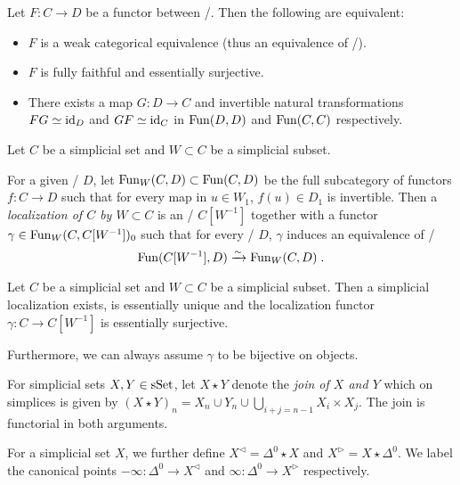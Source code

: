 \begin{thm}\label{thm:eqCharEqOfInftycats}
    Let $F\colon C\to D$ be a functor between \inftycats/.
    Then the following are equivalent:
    \begin{itemize}
        \item $F$ is a weak categorical equivalence (thus an equivalence of \inftycats/).
        \item $F$ is fully faithful and essentially surjective.
        \item There exists a map $G\colon D\to C$ and invertible natural transformations $FG\simeq \text{id}_D$ and $GF\simeq \text{id}_C$ in $\operatorname{Fun}(D,D)$ and $\operatorname{Fun}(C,C)$ respectively.
    \end{itemize}
    \begin{reference}
        \cite[Corollary 3.6.6 and Theorem 3.9.7]{cisinski_2019}
    \end{reference}
\end{thm}
\begin{definition}
    Let $C$ be a simplicial set and $W\subset C$ be a simplicial subset.

    For a given \inftycat/ $D$, let $\operatorname{Fun}_W(C,D)\subset\operatorname{Fun}(C,D)$ be the full subcategory of functors $f\colon C\to D$ such that for every map in $u\in W_1$, $f(u)\in D_1$ is invertible.
    Then a \emph{localization of $C$ by $W\subset C$} is an \inftycat/ $C[W^{-1}]$ together with a functor $\gamma\in\operatorname{Fun}_W(C, C[W^{-1}])_0$ such that for every \inftycat/ $D$, $\gamma$ induces an equivalence of \inftycats/
    \begin{equation*}
        \operatorname{Fun}(C[W^{-1}],D)\xrightarrow{\sim}\operatorname{Fun}_W(C,D)\;.
    \end{equation*}
\end{definition}
\begin{lemma}\label{prop:simpLocEssSurj}
    Let $C$ be a simplicial set and $W\subset C$ be a simplicial subset.
    Then a simplicial localization exists, is essentially unique and the localization functor $\gamma\colon C\to C[W^{-1}]$ is essentially surjective.

    Furthermore, we can always assume $\gamma$ to be bijective on objects.
    \begin{reference}
        \cite[Proposition 7.1.3 and Remark 7.1.4]{cisinski_2019}
    \end{reference}
\end{lemma}
\begin{definition}[Join]
    For simplicial sets $X,Y\in\operatorname{sSet}$, let $X\star Y$ denote the \emph{join of $X$ and $Y$} which on simplices is given by $(X\star Y)_n=X_n\cup Y_n\cup\bigcup\limits_{i+j=n-1}X_i\times X_j$.
    The join is functorial in both arguments.
    
    For a simplicial set $X$, we further define $X^{\lhd}=\Delta^0\star X$ and $X^{\rhd}=X\star\Delta^0$.
    We label the canonical points $-\infty\colon\Delta^0\to X^{\lhd}$ and $\infty\colon\Delta^0\to X^{\rhd}$ respectively.
\end{definition}
